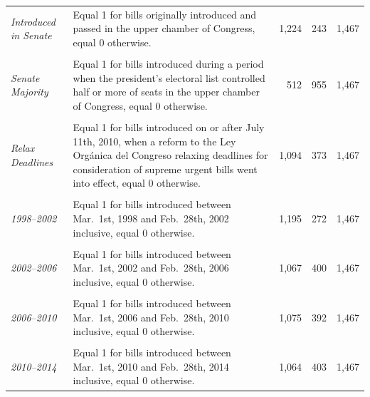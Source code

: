 \documentclass[letter,12pt]{article}
\begin{document}
\begin{footnotesize}
\begin{tabularx}{\textwidth}{lXrrr}
\\ [-1ex]
\emph{Introduced in Senate}          & Equal 1 for bills originally introduced and passed in the upper chamber of Congress, equal 0 otherwise.                      &  1,224 &   243 & 1,467 \\ [.5ex] %
\\ [-1ex]
\emph{Senate Majority}               & Equal 1 for bills introduced during a period when the president's electoral list controlled half or more of seats in the upper chamber of Congress, equal 0 otherwise. &    512 &   955 & 1,467 \\ [.5ex] %
\\ [-1ex]
\emph{Relax Deadlines}               & Equal 1 for bills introduced on or after July 11th, 2010, when a reform to the Ley Orgánica del Congreso relaxing deadlines for consideration of supreme urgent bills went into effect, equal 0 otherwise. &  1,094 &   373 & 1,467 \\ [.5ex] %
\\ [-1ex]
\emph{1998--2002}                    & Equal 1 for bills introduced between Mar.\ 1st, 1998 and Feb.\ 28th, 2002 inclusive, equal 0 otherwise. &  1,195 &   272 & 1,467 \\ [.5ex] %
\\ [-1ex]
\emph{2002--2006}                    & Equal 1 for bills introduced between Mar.\ 1st, 2002 and Feb.\ 28th, 2006 inclusive, equal 0 otherwise.       &  1,067 &   400 & 1,467 \\ [.5ex] %
\\ [-1ex]
\emph{2006--2010}                    & Equal 1 for bills introduced between Mar.\ 1st, 2006 and Feb.\ 28th, 2010 inclusive, equal 0 otherwise.       &  1,075 &   392 & 1,467 \\ [.5ex] %
\\ [-1ex]
\emph{2010--2014}                    & Equal 1 for bills introduced between Mar.\ 1st, 2010 and Feb.\ 28th, 2014 inclusive, equal 0 otherwise.       &  1,064 &   403 & 1,467 \\ [.5ex] %
\hline
\end{tabularx}
\doublespacing
\end{footnotesize}
  
\end{document}
